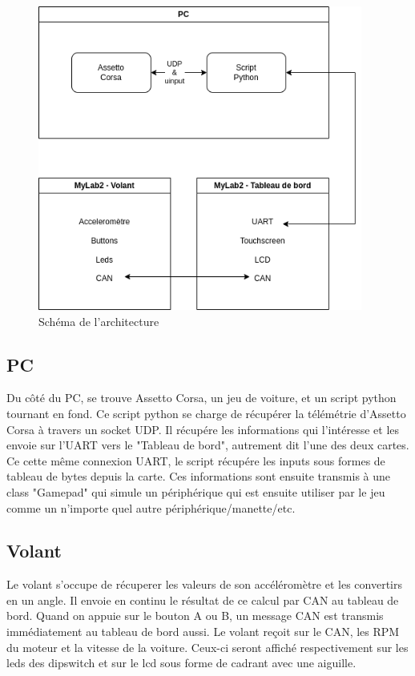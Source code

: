 \documentclass[french, 11pt]{article}
\begin{document}
    \begin{figure}[H]
        \centering
        \includegraphics[width=0.95\textwidth]{architecture.drawio.png}
        \caption{Schéma de l'architecture}
    \end{figure}
        
        \subsection{PC}

        Du côté du PC, se trouve Assetto Corsa, un jeu de voiture, et un script python tournant en fond. Ce script python se charge de récupérer la télémétrie d'Assetto Corsa à travers un socket UDP. Il récupére les informations qui l'intéresse et les envoie sur l'UART vers le "Tableau de bord", autrement dit l'une des deux cartes. Ce cette même connexion UART, le script récupére les inputs sous formes de tableau de bytes depuis la carte. Ces informations sont ensuite transmis à une class "Gamepad" qui simule un périphérique qui est ensuite utiliser par le jeu comme un n'importe quel autre périphérique/manette/etc.


        \subsection{Volant}

        Le volant s'occupe de récuperer les valeurs de son accéléromètre et les convertirs en un angle. Il envoie en continu le résultat de ce calcul par CAN au tableau de bord. Quand on appuie sur le bouton A ou B, un message CAN est transmis immédiatement au tableau de bord aussi. Le volant reçoit sur le CAN, les RPM du moteur et la vitesse de la voiture. Ceux-ci seront affiché respectivement sur les leds des dipswitch et sur le lcd sous forme de cadrant avec une aiguille.
\end{document}
